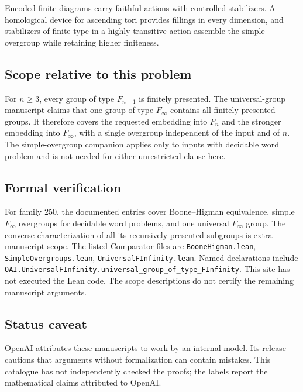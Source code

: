 \documentclass[11pt]{article}
\begin{document}
Encoded finite diagrams carry faithful actions with controlled stabilizers. A homological device for ascending tori provides fillings in every dimension, and stabilizers of finite type in a highly transitive action assemble the simple overgroup while retaining higher finiteness.

\subsection{Scope relative to this problem}
For $n\ge3$, every group of type $F_{n-1}$ is finitely presented. The universal-group manuscript claims that one group of type $F_\infty$ contains all finitely presented groups. It therefore covers the requested embedding into $F_n$ and the stronger embedding into $F_\infty$, with a single overgroup independent of the input and of $n$. The simple-overgroup companion applies only to inputs with decidable word problem and is not needed for either unrestricted clause here.

\subsection{Formal verification}
For family 250, the documented entries cover Boone--Higman equivalence, simple $F_\infty$ overgroups for decidable word problems, and one universal $F_\infty$ group. The converse characterization of all its recursively presented subgroups is extra manuscript scope. The listed Comparator files are \texttt{BooneHigman.lean}, \texttt{SimpleOvergroups.lean}, \texttt{UniversalFInfinity.lean}. Named declarations include \texttt{OAI.UniversalFInfinity.universal\_group\_of\_type\_FInfinity}. This site has not executed the Lean code. The scope descriptions do not certify the remaining manuscript arguments.

\subsection{Status caveat}
OpenAI attributes these manuscripts to work by an internal model. Its release cautions that arguments without formalization can contain mistakes. This catalogue has not independently checked the proofs; the labels report the mathematical claims attributed to OpenAI.
\end{document}
